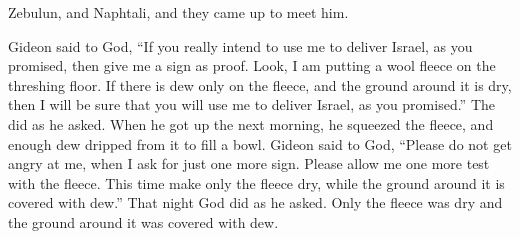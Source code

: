 {Zebulun,
and Naphtali,
and they came up
to meet him.
\par }{\PP {}Gideon
said
to
God,
“If
you really
intend to use me to deliver
Israel,
as
you promised, then give me a sign as proof.
Look,
I am
putting
a wool
fleece
on the threshing floor.
If
there is dew
only on
the fleece,
and the ground
around it is dry,
then I will be sure
that
you will use me to deliver
Israel,
as
you promised.”
The
{} did as he asked. When
he got up
the next morning,
he squeezed
the fleece,
and enough dew
dripped
from
it
to fill
a bowl.
Gideon
said
to
God,
“Please
do not
get angry
at me,
when
I ask
for just
one more
sign. Please allow me one more test
with the fleece.
This time make
only
the fleece
dry,
while the ground
around it is covered with dew.”
That
night
God
did
as he
asked. Only
the fleece
was dry
and the ground
around it was
covered with dew.

}

